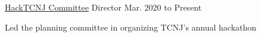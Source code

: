 

\begin{cventry}
    {\href{https://www.tcnj.edu/~acm}{HackTCNJ Committee}}
    {Director}
    {Mar. 2020 to Present}
    {}{}
    \begin{cvparagraph}
        Led the planning committee in organizing TCNJ's annual hackathon
    \end{cvparagraph}
\end{cventry}
